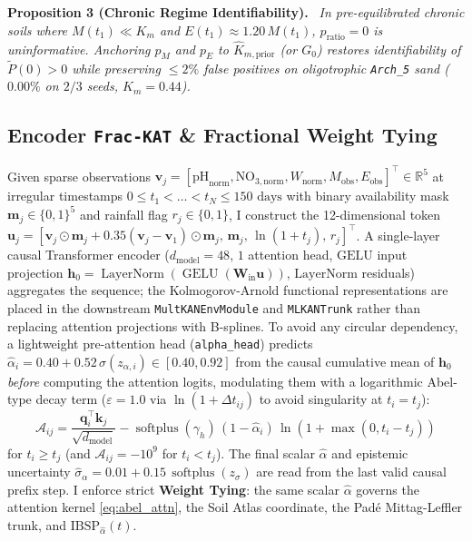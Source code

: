 \documentclass[10pt,twocolumn,a4paper]{article}
\begin{document}
\noindent\textbf{Proposition 3 (Chronic Regime Identifiability).}\ \textit{
In pre-equilibrated chronic soils where $M(t_1) \ll K_m$ and $E(t_1) \approx 1.20\,M(t_1)$, $p_{\mathrm{ratio}} = 0$ is uninformative. Anchoring $p_M$ and $p_E$ to $\hat{K}_{m,\mathrm{prior}}$ (or $G_0$) restores identifiability of $\tilde{P}(0) > 0$ while preserving $\le 2\%$ false positives on oligotrophic \texttt{Arch\_5} sand ($0.00\%$ on $2/3$ seeds, $K_m = 0.44$).
}

\subsection{Encoder \texttt{Frac-KAT} \& Fractional Weight Tying}

Given sparse observations $\mathbf{v}_j = [\text{pH}_{\text{norm}}, \text{NO}_{3,\text{norm}}, W_{\text{norm}}, M_{\text{obs}}, E_{\text{obs}}]^\top \in \mathbb{R}^5$ at irregular timestamps $0 \le t_1 < \dots < t_N \le 150\text{ days}$ with binary availability mask $\mathbf{m}_j \in \{0,1\}^5$ and rainfall flag $r_j \in \{0,1\}$, I construct the 12-dimensional token $\mathbf{u}_j = [\mathbf{v}_j\odot\mathbf{m}_j + 0.35(\mathbf{v}_j - \mathbf{v}_1)\odot\mathbf{m}_j,\, \mathbf{m}_j,\, \ln(1+t_j),\, r_j]^\top$. A single-layer causal Transformer encoder ($d_{\text{model}} = 48$, $1$ attention head, $\text{GELU}$ input projection $\mathbf{h}_0 = \operatorname{LayerNorm}(\operatorname{GELU}(\mathbf{W}_{\text{in}}\mathbf{u}))$, $\text{LayerNorm}$ residuals) aggregates the sequence; the Kolmogorov-Arnold functional representations are placed in the downstream \texttt{MultKANEnvModule} and \texttt{MLKANTrunk} rather than replacing attention projections with B-splines. To avoid any circular dependency, a lightweight pre-attention head (\texttt{alpha\_head}) predicts $\hat{\alpha}_i = 0.40 + 0.52\,\sigma(z_{\alpha,i}) \in [0.40, 0.92]$ from the causal cumulative mean of $\mathbf{h}_0$ \emph{before} computing the attention logits, modulating them with a logarithmic Abel-type decay term ($\varepsilon = 1.0$ via $\ln(1 + \Delta t_{ij})$ to avoid singularity at $t_i = t_j$):
\begin{equation}
  \mathcal{A}_{ij} = \frac{\mathbf{q}_i^\top \mathbf{k}_j}{\sqrt{d_{\text{model}}}} - \operatorname{softplus}(\gamma_h)\,(1 - \hat{\alpha}_i)\,\ln\!\left(1 + \max(0, t_i - t_j)\right) \label{eq:abel_attn}
\end{equation}
for $t_i \ge t_j$ (and $\mathcal{A}_{ij} = -10^9$ for $t_i < t_j$). The final scalar $\hat{\alpha}$ and epistemic uncertainty $\hat{\sigma}_\alpha = 0.01 + 0.15\,\operatorname{softplus}(z_\sigma)$ are read from the last valid causal prefix step. I enforce strict \textbf{Weight Tying}: the same scalar $\hat{\alpha}$ governs the attention kernel \eqref{eq:abel_attn}, the Soil Atlas coordinate, the Pad\'e Mittag-Leffler trunk, and $\text{IBSP}_{\hat{\alpha}}(t)$.
\end{document}
